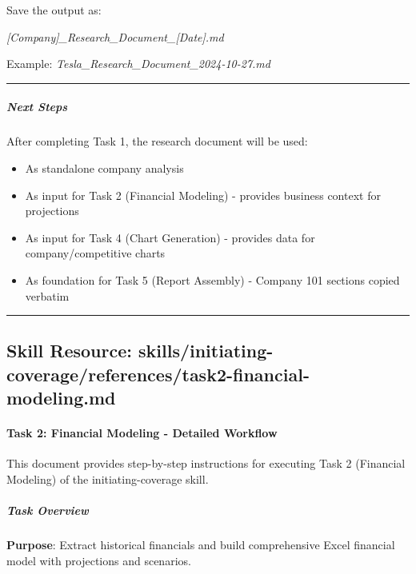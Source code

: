\documentclass[11pt]{article}
\begin{document}
Save the output as:


\emph{[Company]\_\allowbreak{}Research\_\allowbreak{}Document\_\allowbreak{}[Date].md}


Example: \emph{Tesla\_\allowbreak{}Research\_\allowbreak{}Document\_\allowbreak{}2024-10-27.md}


\vspace{0.5em}\hrule\vspace{0.5em}

\subparagraph{Next Steps}\mbox{}\par

After completing Task 1, the research document will be used:


\begin{itemize}[leftmargin=*,itemsep=2pt,topsep=2pt]
\item {} As standalone company analysis
\item {} As input for Task 2 (Financial Modeling) - provides business context for projections
\item {} As input for Task 4 (Chart Generation) - provides data for company/competitive charts
\item {} As foundation for Task 5 (Report Assembly) - Company 101 sections copied verbatim
\end{itemize}

\vspace{0.8em}\hrule\vspace{0.8em}

\subsection{Skill Resource: skills/initiating-coverage/references/task2-financial-modeling.md}\label{file:skills-initiating-coverage-references-task2-financial-modeling-md}

\paragraph{Task 2: Financial Modeling - Detailed Workflow}\mbox{}\par

This document provides step-by-step instructions for executing Task 2 (Financial Modeling) of the initiating-coverage skill.


\subparagraph{Task Overview}\mbox{}\par

\textbf{Purpose}: Extract historical financials and build comprehensive Excel financial model with projections and scenarios.
\end{document}
